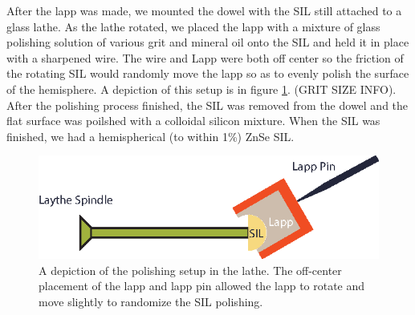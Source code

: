 \indent After the lapp was made, we mounted the dowel with the SIL still attached to a glass lathe. As the lathe rotated, we placed the lapp with a mixture of glass polishing solution of various grit and mineral oil onto the SIL and held it in place with a sharpened wire. The wire and Lapp were both off center so the friction of the rotating SIL would randomly move the lapp so as to evenly polish the surface of the hemisphere. A depiction of this setup is in figure \ref{polish}. (GRIT SIZE INFO). After the polishing process finished, the SIL was removed from the dowel and the flat surface was poilshed with a colloidal silicon mixture. When the SIL was finished, we had a hemispherical (to within 1\%) ZnSe SIL.

\begin{figure}[h!]
\centering
\includegraphics[width = .8\textwidth]{lathe.eps}
\caption{ \doublespacing A depiction of the polishing setup in the lathe. The off-center placement of the lapp and lapp pin allowed the lapp to rotate and move slightly to randomize the SIL polishing.}
\label{polish}
\end{figure}

